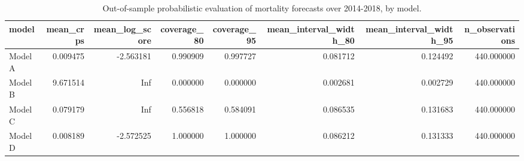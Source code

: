 \begin{table}[ht]
\centering
\begin{tabular}{lrrrrrrr}
\hline
model & mean_crps & mean_log_score & coverage_80 & coverage_95 & mean_interval_width_80 & mean_interval_width_95 & n_observations \\
\hline
Model A & 0.009475 & -2.563181 & 0.990909 & 0.997727 & 0.081712 & 0.124492 & 440.000000 \\
Model B & 9.671514 & Inf & 0.000000 & 0.000000 & 0.002681 & 0.002729 & 440.000000 \\
Model C & 0.079179 & Inf & 0.556818 & 0.584091 & 0.086535 & 0.131683 & 440.000000 \\
Model D & 0.008189 & -2.572525 & 1.000000 & 1.000000 & 0.086212 & 0.131333 & 440.000000 \\
\hline
\end{tabular}
\caption{Out-of-sample probabilistic evaluation of mortality forecasts over 2014-2018, by model.}
\label{tab:new_table_6_4}
\end{table}
